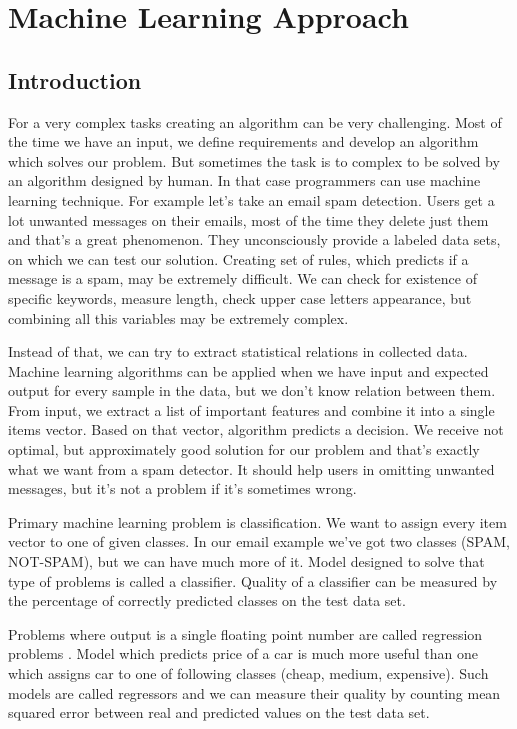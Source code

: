 \documentclass[declaration,shortabstract,english,inz]{iithesis}
\begin{document}
\chapter{Machine Learning Approach}

\section{Introduction}


For a very complex tasks creating an algorithm can be very challenging.
Most of the time we have an input, we define requirements and develop an algorithm which solves our problem.
But sometimes the task is to complex to be solved by an algorithm designed by human.
In that case programmers can use machine learning technique.
For example let's take an email spam detection.
Users get a lot  unwanted messages on their emails, most of the time they delete just them and that's a great phenomenon.
They unconsciously provide a labeled data sets, on which we can test our solution.
Creating set of rules, which predicts if a message is a spam, may be extremely difficult.
We can check for existence of specific keywords, measure length, check upper case letters appearance, but combining all this variables may be extremely complex.

 Instead of that, we can try to extract statistical relations in collected data.
Machine learning algorithms can be applied when we have input and expected output for every sample in the data, but we don't know relation between them.
From input, we extract a list of important features and combine it into a single items vector.
Based on that vector, algorithm predicts a decision. 
We receive not optimal, but approximately good solution for our problem and that's exactly what we want from a spam detector.
It should help users in omitting unwanted messages, but it's not a problem if it's sometimes wrong.

Primary machine learning problem is classification\cite{Introduction_ML}.
We want to assign every item vector to one of given classes.
In our email example we've got two classes (SPAM, NOT-SPAM), but we can have much more of it.
Model designed to solve that type of problems is called a classifier.
Quality of a classifier can be measured by the percentage of correctly predicted classes on the test data set.

Problems where output is a single floating point number are called regression problems \cite{Introduction_ML}.
Model which predicts price of a car is much more useful than one which assigns car to one of following classes  (cheap, medium, expensive).
Such models are called regressors and we can measure their quality by counting mean squared error between real and predicted values on the test data set.
\end{document}
